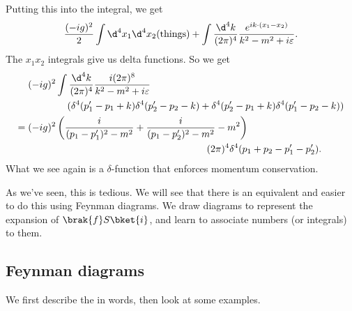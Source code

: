\documentclass[a4paper]{article}
\begin{document}
\begin{eg}
  Putting this into the integral, we get
  \[
    \frac{(-ig)^2}{2}\int \d^4 x_1 \d^4 x_2 (\text{things}) + \int \frac{\d^4 k}{(2\pi)^4} \frac{e^{ik\cdot(x_1 - x_2)}}{k^2 - m^2 + i \varepsilon}.
  \]
  The $x_1x_2$ integrals give us delta functions. So we get
  \begin{align*}
    &(-ig)^2 \int \frac{\d^4 k}{(2\pi)^4} \frac{i (2\pi)^8}{k^2 - m^2 + i \varepsilon} \\
    &\hphantom{(-ig)^2 \int}(\delta^4(p_1' - p_1 + k) \delta^4(p_2' - p_2 - k) + \delta^4(p_2' - p_1 + k) \delta^4(p_1' - p_2 - k))\\
    ={}& (-ig)^2 \left(\frac{i}{(p_1 - p_1')^2 - m^2} + \frac{i}{(p_1 - p_2')^2 - m^2} - m^2\right)\\
    &\hphantom{(-ig)^2 \frac{i}{(p_1 - p_1')^2 - m^2} + \frac{i}{(p_1 - p_2')^2 - m^2}}(2\pi)^4 \delta^4(p_1 + p_2 - p_1' - p_2').
  \end{align*}
  What we see again is a $\delta$-function that enforces momentum conservation.
\end{eg}
As we've seen, this is tedious. We will see that there is an equivalent and easier to do this using Feynman diagrams. We draw diagrams to represent the expansion of $\brak{f}S\bket{i}$, and learn to associate numbers (or integrals) to them.

\subsection{Feynman diagrams}
We first describe the  in words, then look at some examples.
\end{document}
